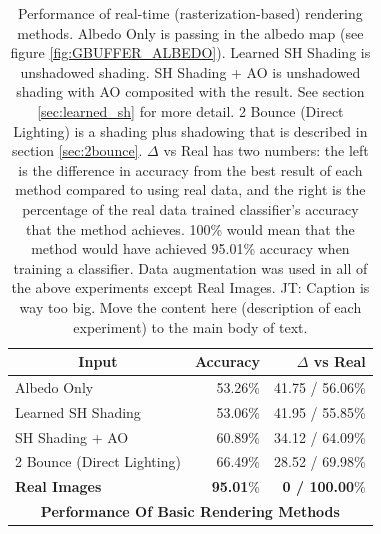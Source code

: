 \documentclass[10pt,twocolumn,letterpaper]{article}
\newcommand{\tompson}[1]{{\color{green} JT: #1}}
\begin{document}
\begin{table}[]
\centering
\label{tblnonGI}
\begin{tabular}{|l|r|r|}
\hline
\multicolumn{1}{|c|}{\textbf{Input}}
& \multicolumn{1}{r|}{\textbf{Accuracy}}
& \multicolumn{1}{r|}{\textbf{$\Delta$ vs Real}} \\ \hline
Albedo Only 				&53.26\%	& 41.75 / 56.06\%	\\
Learned SH Shading			&53.06\%	& 41.95 / 55.85\%	\\
SH Shading + AO				&60.89\%    & 34.12 / 64.09\%   \\
2 Bounce (Direct Lighting)	&66.49\%	& 28.52 / 69.98\%   \\
\textbf{Real Images}		& \textbf{95.01}\%	& \textbf{0 / 100.00}\%	\\ \hline
\multicolumn{3}{|c|}{\textbf{Performance Of Basic Rendering Methods}}	\\ \hline
\end{tabular}

\caption{Performance of real-time (rasterization-based) rendering methods. Albedo Only is passing in the albedo map (see figure \ref{fig:GBUFFER_ALBEDO}). Learned SH Shading is unshadowed shading. SH Shading + AO is unshadowed shading with AO composited with the result. See section \ref{sec:learned_sh} for more detail. 2 Bounce (Direct Lighting) is a shading plus shadowing that is described in section \ref{sec:2bounce}. $\Delta$ vs Real has two numbers: the left is the difference in accuracy from the best result of each method compared to using real data, and the right is the percentage of the real data trained classifier's accuracy that the method achieves.  100\% would mean that the method would have achieved 95.01\% accuracy when training a classifier. Data augmentation was used in all of the above experiments except Real Images. \tompson{Caption is way too big. Move the content here (description of each experiment) to the main body of text.}} 
\end{table}
\end{document}
